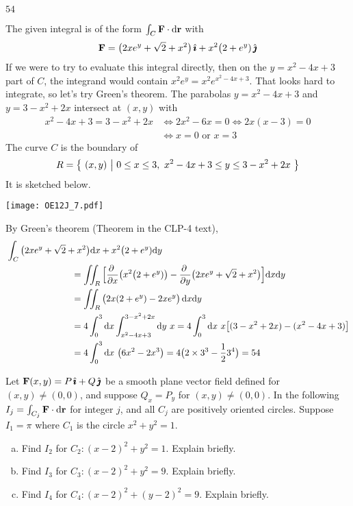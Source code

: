 \begin{answer} 
$54$
\end{answer}

\begin{solution}
The given integral is of the form $\int_C \mathbf{F}\cdot\mathrm{d}\mathbf{r}$
with
\begin{equation*}
\mathbf{F} = \big(2xe^y + \sqrt{2} + x^2\big)\,\hat{\pmb{\imath}} 
      + x^2 \big(2 + e^y)\,\hat{\pmb{\jmath}}
\end{equation*}
If we were to try to evaluate this integral directly, then on the
$y=x^2-4x+3$ part of $C$, the 
integrand would contain $x^2 e^y = x^2 e^{x^2-4x+3}$. That looks hard to integrate, so let's try Green's theorem. 
The parabolas $y = x^2 - 4x + 3$ and $y = 3 - x^2 + 2x$
intersect at $(x,y)$ with
\begin{align*}
x^2 - 4x + 3 = 3 - x^2 + 2x
&\iff
2x^2 -6x = 0
\iff
2x(x-3)=0 \\
&\iff
x=0\text{ or }x=3
\end{align*}
The curve $C$ is the boundary
of 
\begin{equation*}
R= \big\{ \ (x,y)\ \big|\ 0\le x\le 3,\ x^2 - 4x + 3 \le y\le  3 - x^2 + 2x\ \big\}
\end{equation*}
It is sketched below.
\begin{center}
     \texttt{[image: OE12J\_7.pdf]}
\end{center}
By Green's theorem  (Theorem  in the CLP-4 text), 
\begin{align*}
&\int_C \big(2xe^y + \sqrt{2} + x^2\big)\dee{x} 
      + x^2 \big(2 + e^y)\dee{y} \\
&\hskip1in
= \dblInt_R\Big[\pdiff{}{x}\big(x^2 \big(2 + e^y)\big)
-\pdiff{}{y}\big(2xe^y + \sqrt{2} + x^2\big)\Big] \dee{x}\dee{y}
\\
&\hskip1in = \dblInt_R \big(2x(2+e^y) - 2xe^y\big)\,\dee{x}\dee{y} \\
&\hskip1in =4 \int_0^3\dee{x}\int_{x^2 - 4x + 3}^{3 - x^2 + 2x}\dee{y}\  x 
=4 \int_0^3\dee{x}\ x\big[(3 - x^2 + 2x) - (x^2 - 4x + 3)\big]\\
&\hskip1in =4 \int_0^3\dee{x}\ \big(6x^2-2x^3\big)
= 4\big(2\times 3^3-\frac{1}{2}3^4\big)
=54
\end{align*}
\end{solution}

\begin{question}[M317 2016D] %
Let $\mathbf{F}(x, y) = P \,\hat{\pmb{\imath}} + Q\,\hat{\pmb{\jmath}}$ be a smooth plane vector field 
defined for $(x,y) \ne (0, 0)$, and suppose $Q_x = P_y$ for 
$(x,y) \ne  (0, 0)$. In the following $I_j = \int_{C_j} \mathbf{F}\cdot\mathrm{d}\mathbf{r}$
for integer $j$, and all $C_j$ are positively oriented circles. Suppose 
$I_1 = \pi$ where $C_1$ is the circle $x^2 + y^2 = 1$.
\begin{enumerate}[(a)]
\item
Find $I_2$ for $C_2 : (x - 2)^2 + y^2 = 1$. Explain briefly.
\item
Find $I_3$ for $C_3 : (x - 2)^2 + y^2 = 9$. Explain briefly.
\item
Find $I_4$ for $C_4 : (x - 2)^2 + (y-2)^2 = 9$. Explain briefly.
\end{enumerate}
\end{question}

